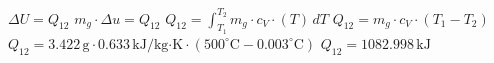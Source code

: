 \( \Delta U = Q_{12} \)  
\( m_g \cdot \Delta u = Q_{12} \)  
\( Q_{12} = \int_{T_1}^{T_2} m_g \cdot c_V \cdot (T) \, dT \)  
\( Q_{12} = m_g \cdot c_V \cdot (T_1 - T_2) \)  
\( Q_{12} = 3.422 \, \text{g} \cdot 0.633 \, \text{kJ/kg·K} \cdot (500^\circ \text{C} - 0.003^\circ \text{C}) \)  
\( Q_{12} = 1082.998 \, \text{kJ} \)